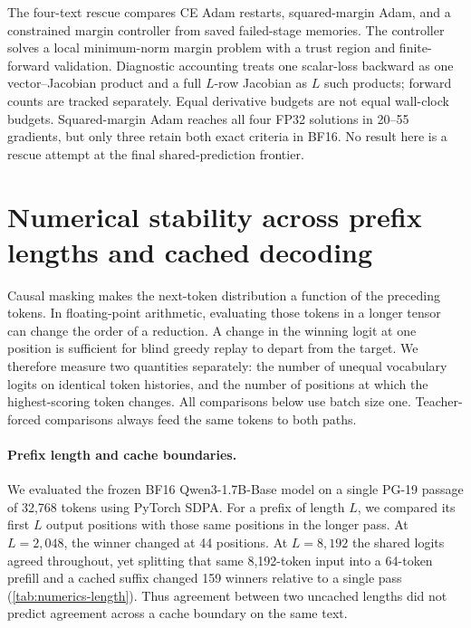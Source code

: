 The four-text rescue compares CE Adam restarts, squared-margin Adam, and a constrained margin controller from saved failed-stage memories.
The controller solves a local minimum-norm margin problem with a trust region and finite-forward validation.
Diagnostic accounting treats one scalar-loss backward as one vector--Jacobian product and a full $L$-row Jacobian as $L$ such products; forward counts are tracked separately.
Equal derivative budgets are not equal wall-clock budgets.
Squared-margin Adam reaches all four FP32 solutions in 20--55 gradients, but only three retain both exact criteria in BF16.
No result here is a rescue attempt at the final shared-prediction frontier.

\section{Numerical stability across prefix lengths and cached decoding}
\label{app:numerics}

Causal masking makes the next-token distribution a function of the preceding tokens.
In floating-point arithmetic, evaluating those tokens in a longer tensor can change the order of a reduction.
A change in the winning logit at one position is sufficient for blind greedy replay to depart from the target.
We therefore measure two quantities separately: the number of unequal vocabulary logits on identical token histories, and the number of positions at which the highest-scoring token changes.
All comparisons below use batch size one. Teacher-forced comparisons always feed the same tokens to both paths.

\paragraph{Prefix length and cache boundaries.}
We evaluated the frozen BF16 Qwen3-1.7B-Base model on a single PG-19 passage of 32,768 tokens using PyTorch SDPA.
For a prefix of length $L$, we compared its first $L$ output positions with those same positions in the longer pass.
At $L=2{,}048$, the winner changed at 44 positions. At $L=8{,}192$ the shared logits agreed throughout, yet splitting that same 8,192-token input into a 64-token prefill and a cached suffix changed 159 winners relative to a single pass (\cref{tab:numerics-length}).
Thus agreement between two uncached lengths did not predict agreement across a cache boundary on the same text.

